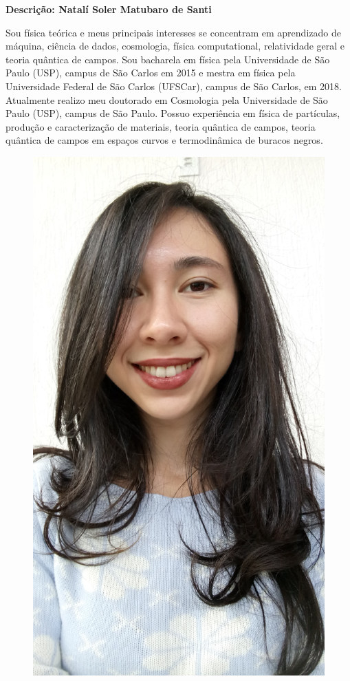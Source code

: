 \documentclass[11pt,a4paper,titlepage,brazil]{article}
\begin{document}
\begin{center}
 \large{\textbf{Descrição: Natalí Soler Matubaro de Santi}}\\
\end{center}

Sou física teórica e meus principais interesses se concentram em aprendizado de máquina, ciência de dados, cosmologia, física computational, relatividade geral e teoria quântica de campos. Sou bacharela em física pela Universidade de São Paulo (USP), campus de São Carlos em 2015 e mestra em física pela Universidade Federal de São Carlos (UFSCar), campus de São Carlos, em 2018. Atualmente realizo meu doutorado em Cosmologia pela Universidade de São Paulo (USP), campus de São Paulo. Possuo experiência em física de partículas, produção e caracterização de materiais, teoria quântica de campos, teoria quântica de campos em espaços curvos e termodinâmica de buracos negros.

\begin{figure}[h!]
 \centering
 \includegraphics[scale=0.1]{natalidesanti.jpg}
\end{figure}  
\end{document}
